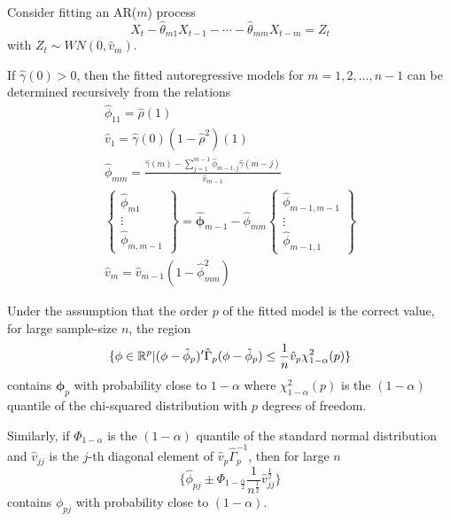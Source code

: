 \begin{thm}
  \label{defn:estimation_arma:3}
  Consider fitting an AR($m$) process
  \begin{equation}
    \label{eq:49}
    X_{t} - \hat \theta_{m1} X_{t-1} - \cdots - \hat \theta_{mm}
    X_{t-m} = Z_{t}
  \end{equation} with $Z_{t} \sim WN(0, \hat v_{m})$.
  
  If $\hat \gamma(0) > 0$, then the fitted autoregressive models for
  $m = 1, 2, \dots, n - 1$ can be determined recursively from the
  relations
  \begin{align}
    \label{eq:48}
    \hat \phi_{11} = \hat \rho(1) \\
    \hat v_{1} = \hat \gamma(0) (1 - \hat \rho^{2})(1) \\
    \hat \phi_{mm} = \frac{\hat \gamma(m) - \sum_{j=1}^{m-1} \hat
      \phi_{m-1, j} \hat \gamma(m - j)}{\hat v_{m-1}} \\
    \begin{Bmatrix}
      \hat \phi_{m1} \\
      \vdots \\
      \hat \phi_{m, m - 1}
    \end{Bmatrix}
    = \hat{\mathbf{\phi}}_{m-1} - \hat \phi_{mm}
    \begin{Bmatrix}
      \hat \phi_{m-1, m-1} \\
      \vdots\ \\
      \hat \phi_{m-1, 1}
    \end{Bmatrix} \\
    \hat v_{m} = \hat v_{m-1}(1 - \hat \phi^{2}_{mm})
  \end{align}
\end{thm}


\begin{thm}
  \label{defn:estimation_arma:4}
  Under the assumption that the order $p$ of the fitted model is the
  correct value, for large sample-size $n$, the region
  \begin{equation}
    \label{eq:50}
    \{ \mathbf{\phi} \in \mathbb{R}^{p} | (\mathbf{\phi} - \hat \phi_{p})'
    \hat \Gamma_{p} (\mathbf{\phi} - \hat{\mathbf{\phi}}_{p}) \leq
    \frac{1}{n} \hat v_{p} \chi^{2}_{1 - \alpha}(p) \}
  \end{equation} contains $\mathbf{\phi}_{p}$ with probability close
  to $1 - \alpha$ where $\chi^{2}_{1-\alpha}(p)$ is the $(1-\alpha)$
  quantile of the chi-squared distribution with $p$ degrees of
  freedom.

  Similarly, if $\Phi_{1-\alpha}$ is the $(1-\alpha)$ quantile of the
  standard normal distribution and $\hat v_{jj}$ is the $j$-th
  diagonal element of $\hat v_{p} \hat \Gamma_{p}^{-1}$, then for
  large $n$
  \begin{equation}
    \label{eq:51}
    \{ \hat \phi_{pj} \pm \Phi_{1-\frac{\alpha}{2}}
    \frac{1}{n^{\frac{1}{2}}} \hat v_{jj}^{\frac{1}{2}} \} 
  \end{equation} contains $\phi_{pj}$ with probability close to $(1 - \alpha)$.
\end{thm}


